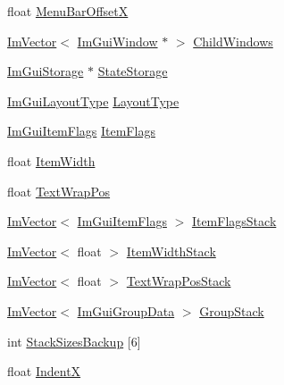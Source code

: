 \begin{DoxyCompactItemize}
\item 
float \mbox{\hyperlink{struct_im_gui_draw_context_a18a950aff641d2a87a3057e9449fdf36}{Menu\+Bar\+OffsetX}}
\item 
\mbox{\hyperlink{class_im_vector}{Im\+Vector}}$<$ \mbox{\hyperlink{struct_im_gui_window}{Im\+Gui\+Window}} $\ast$ $>$ \mbox{\hyperlink{struct_im_gui_draw_context_a70dc80b69c2a4e5fae4009300fe525a5}{Child\+Windows}}
\item 
\mbox{\hyperlink{struct_im_gui_storage}{Im\+Gui\+Storage}} $\ast$ \mbox{\hyperlink{struct_im_gui_draw_context_a507947c789f377ba13767061557fd348}{State\+Storage}}
\item 
\mbox{\hyperlink{imgui__internal_8h_a86d7bb2ee8297d38b131d8ea7e6430c6}{Im\+Gui\+Layout\+Type}} \mbox{\hyperlink{struct_im_gui_draw_context_a8516b32e30504c3037d34e93b7988d83}{Layout\+Type}}
\item 
\mbox{\hyperlink{imgui__internal_8h_abcf9eafab4557e911b2c0d8fe2feeb38}{Im\+Gui\+Item\+Flags}} \mbox{\hyperlink{struct_im_gui_draw_context_a8581650b6011e19f09b12b8bc50a51f5}{Item\+Flags}}
\item 
float \mbox{\hyperlink{struct_im_gui_draw_context_a6327a65273ded49b6aa309167fca4b9e}{Item\+Width}}
\item 
float \mbox{\hyperlink{struct_im_gui_draw_context_a0488b6a84b2f26ddd536fef2ae3f96c3}{Text\+Wrap\+Pos}}
\item 
\mbox{\hyperlink{class_im_vector}{Im\+Vector}}$<$ \mbox{\hyperlink{imgui__internal_8h_abcf9eafab4557e911b2c0d8fe2feeb38}{Im\+Gui\+Item\+Flags}} $>$ \mbox{\hyperlink{struct_im_gui_draw_context_a895d75185a81dc21bb6153090ab5b018}{Item\+Flags\+Stack}}
\item 
\mbox{\hyperlink{class_im_vector}{Im\+Vector}}$<$ float $>$ \mbox{\hyperlink{struct_im_gui_draw_context_af6420717337b44394ad7ccbe55446db2}{Item\+Width\+Stack}}
\item 
\mbox{\hyperlink{class_im_vector}{Im\+Vector}}$<$ float $>$ \mbox{\hyperlink{struct_im_gui_draw_context_ac282b2f910a8846f4c200c358974b12a}{Text\+Wrap\+Pos\+Stack}}
\item 
\mbox{\hyperlink{class_im_vector}{Im\+Vector}}$<$ \mbox{\hyperlink{struct_im_gui_group_data}{Im\+Gui\+Group\+Data}} $>$ \mbox{\hyperlink{struct_im_gui_draw_context_aa775f16a46bdfe8e131e25cab733afe0}{Group\+Stack}}
\item 
int \mbox{\hyperlink{struct_im_gui_draw_context_aedfc8e281f1d72c7c1882c36bebb00d1}{Stack\+Sizes\+Backup}} \mbox{[}6\mbox{]}
\item 
float \mbox{\hyperlink{struct_im_gui_draw_context_a3697085dca9164ca840d1fb1d52c8a66}{IndentX}}

\end{DoxyCompactItemize}
